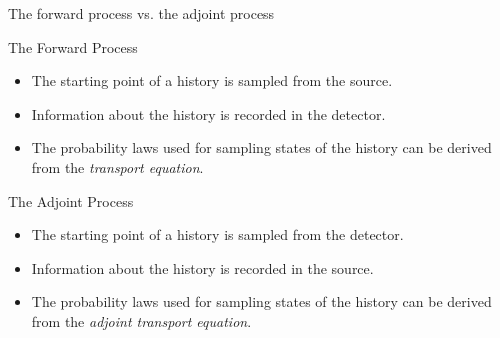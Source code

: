 \documentclass{beamer}
\begin{document}
\begin{frame}{The forward process vs. the adjoint process}

  \medskip

  \begin{beamerboxesrounded}{The Forward Process}
    \begin{itemize}
      \item The starting point of a history is sampled from the source.
      \item Information about the history is recorded in the detector.
      \item The probability laws used for sampling states of the history
        can be derived from the \textit{transport equation}.
    \end{itemize}
  \end{beamerboxesrounded}

  \medskip
  \medskip

  \begin{beamerboxesrounded}{The Adjoint Process}
    \begin{itemize}
      \item The starting point of a history is sampled from the detector.
      \item Information about the history is recorded in the source.
      \item The probability laws used for sampling states of the history
        can be derived from the \textit{adjoint transport equation}.
    \end{itemize}
  \end{beamerboxesrounded}

\end{frame}

\end{document}
